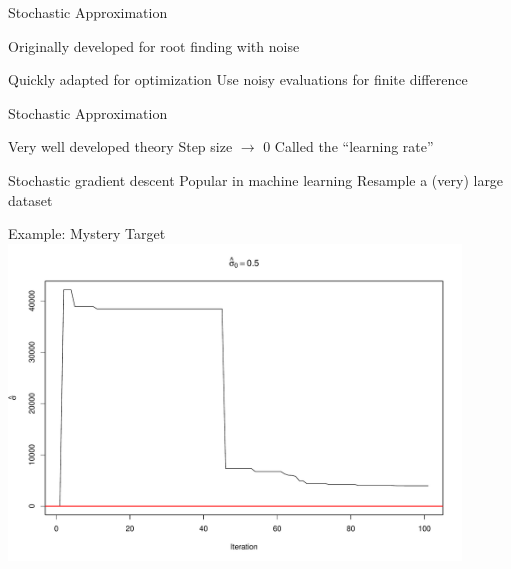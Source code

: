 \documentclass[14pt]{beamer}
\begin{document}
\begin{frame}{Stochastic Approximation}
    \begin{outline}
        \1 Originally developed for root finding with noise
            \2 \citep{Rob51} \newline

        \1 Quickly adapted for optimization
            \2 Use noisy evaluations for finite difference
            \2 \citep{Kie52} 
    \end{outline}
\end{frame}

\begin{frame}{Stochastic Approximation}
    \begin{outline}
        \1 Very well developed theory
        \1 Step size $\rightarrow$ 0
            \2 Called the ``learning rate'' \newline

        \1 Stochastic gradient descent
            \2 Popular in machine learning
            \2 Resample a (very) large dataset

    \end{outline}
\end{frame}

\begin{frame}{Example: Mystery Target}
    \centering
    \includegraphics[height=0.9\textheight, width=0.9\textwidth, keepaspectratio]{Figures/ESS Traj - 0,5.pdf}
\end{frame}
\end{document}

